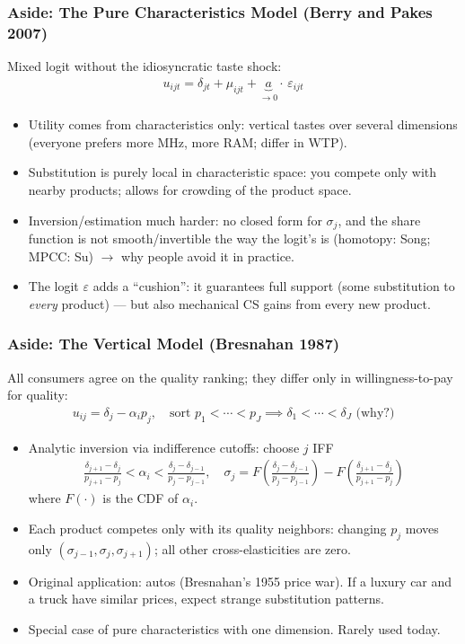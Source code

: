 \documentclass[aspectratio=169,10pt]{beamer}
\begin{document}
\begin{frame}
\frametitle{Aside: The Pure Characteristics Model (Berry and Pakes 2007)}
Mixed logit \alert{without} the idiosyncratic taste shock:
\begin{align*}
u_{ijt} = \delta_{jt} + \mu_{ijt} + \underbrace{a}_{\rightarrow 0} \cdot\, \varepsilon_{ijt}
\end{align*}
\vspace{-0.5cm}
\begin{itemize}
\item Utility comes from characteristics only: vertical tastes over several dimensions (everyone prefers more MHz, more RAM; differ in WTP).
\item Substitution is purely \alert{local} in characteristic space: you compete only with nearby products; allows for \alert{crowding} of the product space.
\item Inversion/estimation much harder: no closed form for $\sigma_j$, and the share function is not smooth/invertible the way the logit's is (homotopy: Song; MPCC: Su) $\rightarrow$ why people avoid it in practice.
\item The logit $\varepsilon$ adds a ``cushion'': it guarantees full support (some substitution to \emph{every} product) --- but also mechanical CS gains from every new product.
\end{itemize}
\end{frame}


\begin{frame}
\frametitle{Aside: The Vertical Model (Bresnahan 1987)}
All consumers agree on the quality ranking; they differ only in willingness-to-pay for quality:
\begin{align*}
u_{ij} = \delta_j - \alpha_i p_j, \quad \text{sort } p_1 < \cdots < p_J \implies \delta_1 < \cdots < \delta_J \text{ (why?)}
\end{align*}
\vspace{-0.5cm}
\begin{itemize}
\item Analytic inversion via \alert{indifference cutoffs}: choose $j$ IFF
\begin{align*}
\frac{\delta_{j+1} - \delta_j}{p_{j+1} -p_j} < \alpha_i < \frac{\delta_j  - \delta_{j-1}}{p_j - p_{j-1}}, \quad
\sigma_j = F\left(\frac{\delta_j  - \delta_{j-1}}{p_j - p_{j-1}} \right) - F\left(\frac{\delta_{j+1} - \delta_j}{p_{j+1} -p_j} \right)
\end{align*}
where $F(\cdot)$ is the CDF of $\alpha_i$.
\item Each product competes \alert{only with its quality neighbors}: changing $p_j$ moves only $(\sigma_{j-1},\sigma_j,\sigma_{j+1})$; all other cross-elasticities are zero.
\item Original application: autos (Bresnahan's 1955 price war). If a luxury car and a truck have similar prices, expect strange substitution patterns.
\item Special case of pure characteristics with one dimension. Rarely used today.
\end{itemize}
\end{frame}
\end{document}
